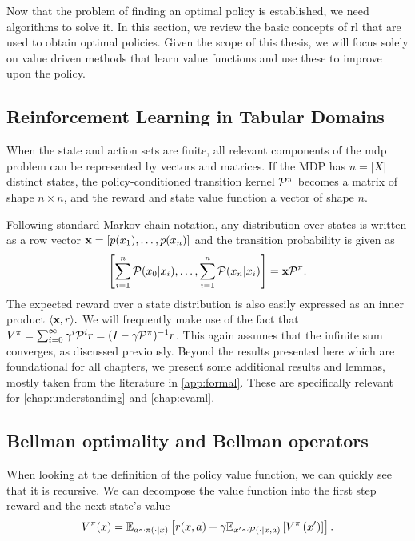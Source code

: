 Now that the problem of finding an optimal policy is established, we need algorithms to solve it.
In this section, we review the basic concepts of \ac{rl} that are used to obtain optimal policies.
Given the scope of this thesis, we will focus solely on value driven methods that learn value functions and use these to improve upon the policy.

\subsection{Reinforcement Learning in Tabular Domains}

When the state and action sets are finite, all relevant components of the \ac{mdp} problem can be represented by vectors and matrices.
If the MDP has $n = |X|$ distinct states, the policy-conditioned transition kernel $\P^\pi$ becomes a matrix of shape $n \times n$, and the reward and state value function a vector of shape $n$.

Following standard Markov chain notation, any distribution over states is written as a row vector $\mathbf{\state} = [p(\state_1),\dots, p(\state_n)]$ and the transition probability is given as $$\left[\sum_{i=1}^n \P(\state_0|\state_i), \dots, \sum_{i=1}^n \P(\state_n|\state_i)\right] = \mathbf{\state} \P^\pi.$$
The expected reward over a state distribution is also easily expressed as an inner product $\langle \mathbf{\state},r\rangle.$
We will frequently make use of the fact that $V^\pi = \sum_{i=0}^\infty \gamma^i \P^i r = (I - \gamma \P^\pi)^{-1}r$.
This again assumes that the infinite sum converges, as discussed previously.
Beyond the results presented here which are foundational for all chapters, we present some additional results and lemmas, mostly taken from the literature in \autoref{app:formal}.
These are specifically relevant for \autoref{chap:understanding} and \autoref{chap:cvaml}.

\subsection{Bellman optimality and Bellman operators}

When looking at the definition of the policy value function, we can quickly see that it is recursive.
We can decompose the value function into the first step reward and the next state's value $$V^\pi(\state) = \mathbb{E}_{a\sim\pi(\cdot|\state)}\left[r(\state,a) + \gamma \mathbb{E}_{\state'\sim\P(\cdot|\state,a)}\left[V^\pi\left(\state'\right)\right]\right].$$

